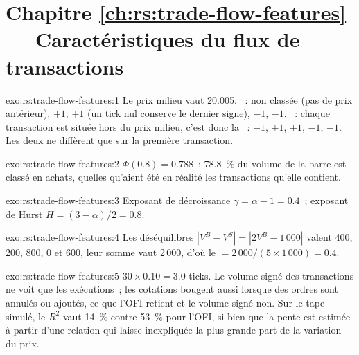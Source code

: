 \section*{Chapitre \ref{ch:rs:trade-flow-features} --- Caractéristiques du flux de transactions}

\begin{solution}{exo:rs:trade-flow-features:1}
Le prix milieu vaut 20.005. ~: non classée (pas de prix antérieur), $+1$, $+1$ (un tick nul conserve le dernier signe), $-1$, $-1$. ~: chaque
transaction est située hors du prix milieu, c'est donc la ~: $-1$, $+1$, $+1$, $-1$, $-1$. Les deux ne diffèrent que sur la première transaction.
\end{solution}

\begin{solution}{exo:rs:trade-flow-features:2}
$\Phi(0.8) = 0.788$~: 78.8~\% du volume de la barre est classé en achats, quelles qu'aient été en réalité les transactions qu'elle contient.
\end{solution}

\begin{solution}{exo:rs:trade-flow-features:3}
Exposant de décroissance $\gamma = \alpha - 1 = 0.4$~; exposant de Hurst $H = (3 - \alpha)/2 = 0.8$.
\end{solution}

\begin{solution}{exo:rs:trade-flow-features:4}
Les déséquilibres $|V^B - V^S| = |2V^B - 1\,000|$ valent 400, 200, 800, 0 et 600, leur somme vaut 2\,000, d'où le  $= 2\,000/(5 \times 1\,000) = 0.4$.
\end{solution}

\begin{solution}{exo:rs:trade-flow-features:5}
$30 \times 0.10 = 3.0$ ticks. Le volume signé des transactions ne voit que les exécutions~; les cotations bougent aussi lorsque des ordres sont annulés ou ajoutés, ce que
l'OFI retient et le volume signé non. Sur le tape simulé, le $R^2$ vaut 14~\% contre 53~\% pour l'OFI, si bien que la pente est estimée
à partir d'une relation qui laisse inexpliquée la plus grande part de la variation du prix.
\end{solution}


